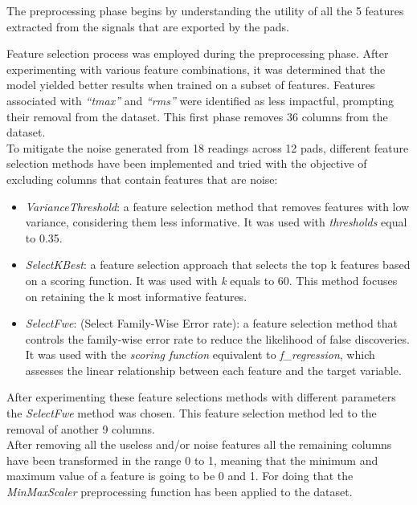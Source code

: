 \documentclass[conference]{IEEEtran}
\begin{document}
The preprocessing phase begins by understanding the utility of all the 5 features extracted 
from the signals that are exported by the pads.

Feature selection process was employed during the preprocessing phase. After experimenting with 
various feature combinations, it was determined that the model yielded better results when 
trained on a subset of features.
Features associated with \textit{“tmax”} and \textit{“rms”} were identified as less impactful, 
prompting their removal from the dataset.
This first phase removes 36 columns from the dataset.\\

To mitigate the noise generated from 18 readings across 12 pads, different feature 
selection methods have been implemented and tried with the objective of excluding 
columns that contain features that are noise:

\begin{itemize}
    \item \textit{VarianceThreshold}: a feature selection method that removes features with low variance, 
    considering them less informative. It was used with \textit{thresholds} equal to 0.35.
    \item \textit{SelectKBest}: a feature selection approach that selects the top k features 
    based on a scoring function. 
    It was used with \textit{k} equals to 60. This method focuses on retaining the k 
    most informative features.
    \item \textit{SelectFwe}: (Select Family-Wise Error rate): a feature selection method 
    that controls the family-wise error rate to reduce the likelihood of false discoveries. 
    It was used with the \textit{scoring function} equivalent to \textit{f\_regression}, 
    which assesses the linear relationship between each feature and the target 
    variable. \cite{OpenAI_ChatGPT_help_me_on_this}
\end{itemize}

After experimenting these feature selections methods with different parameters the \textit{SelectFwe} method 
was chosen. This feature selection method led to the removal of another 9 columns.\\

After removing all the useless and/or noise features all the remaining columns have been transformed 
in the range 0 to 1, meaning that the minimum and maximum value of a feature is going to be 0 and 1. 
For doing that the \textit{MinMaxScaler} preprocessing function has been applied to the dataset.
\end{document}
